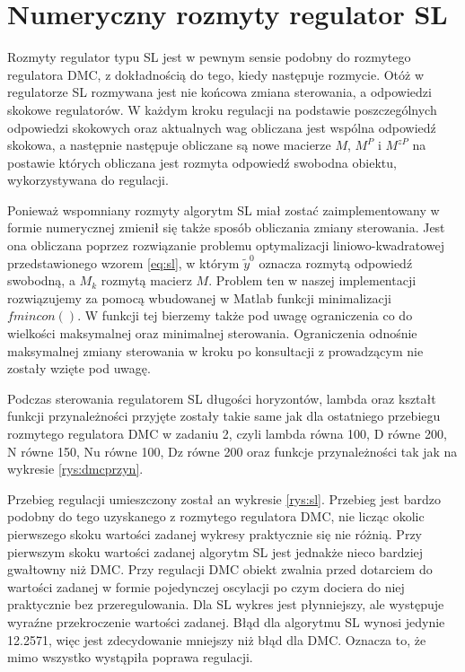 \chapter{Numeryczny rozmyty regulator SL}
	Rozmyty regulator typu SL jest w pewnym sensie podobny do rozmytego regulatora DMC, z dokładnością do tego, kiedy następuje rozmycie. Otóż w regulatorze SL rozmywana jest nie końcowa zmiana sterowania, a odpowiedzi skokowe regulatorów. W każdym kroku regulacji na podstawie poszczególnych odpowiedzi skokowych oraz aktualnych wag obliczana jest wspólna odpowiedź skokowa, a następnie następuje obliczane są nowe macierze $M$, $M^P$ i $M^{zP}$ na postawie których obliczana jest rozmyta odpowiedź swobodna obiektu, wykorzystywana do regulacji.
	
	Ponieważ wspomniany rozmyty algorytm SL miał zostać zaimplementowany w formie numerycznej zmienił się także sposób obliczania zmiany sterowania. Jest ona obliczana poprzez rozwiązanie problemu optymalizacji liniowo-kwadratowej przedstawionego wzorem \ref{eq:sl}, w którym $\tilde{y}^0$ oznacza rozmytą odpowiedź swobodną, a $M_k$ rozmytą macierz $M$. Problem ten w naszej implementacji rozwiązujemy za pomocą wbudowanej w Matlab funkcji minimalizacji $fmincon()$. W funkcji tej bierzemy także pod uwagę ograniczenia co do wielkości maksymalnej oraz minimalnej sterowania. Ograniczenia odnośnie maksymalnej zmiany sterowania w kroku po konsultacji z prowadzącym nie zostały wzięte pod uwagę.
	
	Podczas sterowania regulatorem SL długości horyzontów, lambda oraz kształt funkcji przynależności przyjęte zostały takie same jak dla ostatniego przebiegu rozmytego regulatora DMC w zadaniu 2, czyli lambda równa 100, D równe 200, N równe 150, Nu równe 100, Dz równe 200 oraz funkcje przynależności tak jak na wykresie \ref{rys:dmcprzyn}.
	
	Przebieg regulacji umieszczony został an wykresie \ref{rys:sl}. Przebieg jest bardzo podobny do tego uzyskanego z rozmytego regulatora DMC, nie licząc okolic pierwszego skoku wartości zadanej wykresy praktycznie się nie różnią. Przy pierwszym skoku wartości zadanej algorytm SL jest jednakże nieco bardziej gwałtowny niż DMC. Przy regulacji DMC obiekt zwalnia przed dotarciem do wartości zadanej w formie pojedynczej oscylacji po czym dociera do niej praktycznie bez przeregulowania. Dla SL wykres jest płynniejszy, ale występuje wyraźne przekroczenie wartości zadanej. Błąd dla algorytmu SL wynosi jedynie 12.2571, więc jest zdecydowanie mniejszy niż błąd dla DMC. Oznacza to, że mimo wszystko wystąpiła poprawa regulacji.
	

